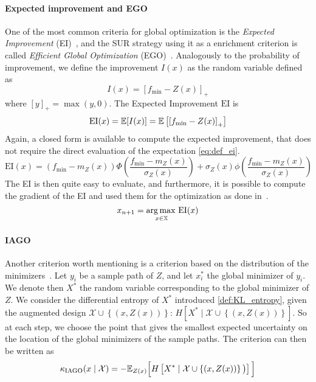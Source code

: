 \documentclass[../../Main_ManuscritThese.tex]{subfiles}
\begin{document}
\paragraph{Expected improvement and EGO}
One of the most common criteria for global optimization is the \emph{Expected Improvement} (EI)~\cite{mockus_bayesian_1974}, and the SUR strategy using it as a enrichment criterion is called \emph{Efficient Global Optimization} (EGO)~\cite{jones_efficient_1998}.
Analogously to the probability of improvement, we define the improvement $I(x)$ as the random variable defined as
\begin{equation}
  \label{eq:def_improvement}
  I(x) = {\left[f_{\min} - Z(x)\right]}_+
\end{equation}
where $[y]_+ = \max(y, 0)$.
The Expected Improvement $\mathrm{EI}$ is 
\begin{align}
  \label{eq:def_ei}
  \mathrm{EI}(x) = \mathbb{E}[I(x)]  = \mathbb{E}\left[\left[f_{\min} - Z(x) \right]_+\right]
\end{align}
Again, a closed form is available to compute the expected improvement, that does not require the direct evaluation of the expectation \cref{eq:def_ei}.
\begin{equation}
  \mathrm{EI}(x) = \left(f_{\min} - m_Z(x)\right) \Phi\left(\frac{f_{\min} - m_Z(x)}{\sigma_Z(x)}\right) + \sigma_Z(x) \phi\left(\frac{f_{\min} - m_Z(x)}{\sigma_Z(x)}\right)
\end{equation}
The EI is then quite easy to evaluate, and furthermore, it is possible to compute the gradient of the EI and used them for the optimization as done in~\cite{pardalos_differentiating_2015}.
\begin{equation}
  x_{n+1} = \operatorname*{arg\,max \,}_{x\in \mathbb{X}} \mathrm{EI}(x)
\end{equation}
\paragraph{IAGO}
\label{ssec:IAGO} Another criterion worth mentioning is a criterion based on the distribution of the minimizers~\cite{villemonteix_informational_2006,hennig_entropy_2011}.
Let $y_i$ be a sample path of $Z$, and let $x_i^*$ the global minimizer of $y_i$.
We denote then $X^*$ the random variable corresponding to the global minimizer of $Z$.
We consider the differential entropy of $X^*$ introduced \cref{def:KL_entropy}, given the augmented design $\mathcal{X} \cup \left\{\left(x,Z(x)\right)\right\}$: $H[X^*\mid \mathcal{X} \cup \left\{(x, Z(x))\right\}]$.
 So at each step, we choose the point that gives the smallest expected uncertainty on the location of the global minimizers of the sample paths.
The criterion can then be written as
\begin{equation}
  \kappa_{\mathrm{IAGO}}(x \mid \mathcal{X})=-\mathbb{E}_{Z(x)}\Big[H\left[X^* \mid \mathcal{X} \cup \left\{(x, Z(x))\right\} \big)\right]\Big]
\end{equation}
\end{document}
